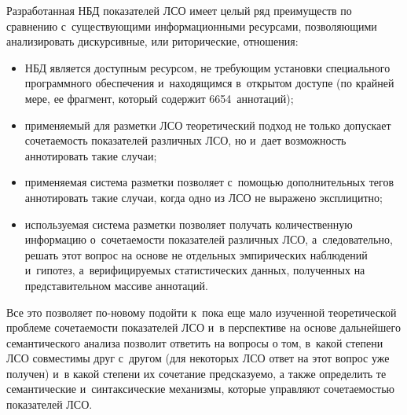 \begin{multicols}{2}
  Разработанная НБД показателей ЛСО имеет\linebreak
   целый ряд преимуществ по 
сравнению с~существующими информационными ресурсами, поз\-во\-ля\-ющи\-ми 
анализировать дискурсивные, или риторические, отношения:
  \begin{itemize}
\item НБД является доступным ресурсом, не требующим установки 
специального программного обеспечения и~находящимся в~открытом 
доступе (по крайней мере, ее фрагмент, который содержит 6654~аннотаций);\\[-14pt]
\item применяемый для разметки ЛСО теоретический подход не только 
допускает сочетаемость показателей различных ЛСО, но и~дает возможность 
аннотировать такие случаи;\\[-14pt]
\item применяемая система разметки позволяет с~помощью дополнительных 
тегов аннотировать такие случаи, когда одно из ЛСО не выражено 
эксплицитно;\\[-14pt]
\item используемая система разметки позволяет получать количественную 
информацию о~сочетаемости показателей различных ЛСО, а~следовательно, 
решать этот вопрос на основе не отдельных эмпирических наблюдений 
и~гипотез, а~верифицируемых статистических данных, полученных на 
представительном массиве аннотаций.
\end{itemize}
  
  Все это позволяет по-новому подойти к~пока еще мало изученной 
теоретической проблеме со\-че\-та\-емости показателей ЛСО и~в перспективе на 
основе дальнейшего семантического анализа позволит ответить на вопросы о 
том, в~какой степени ЛСО совместимы друг с~другом (для некоторых ЛСО 
ответ на этот вопрос уже получен) и~в какой степени их сочетание 
предсказуемо, а также определить те семантические и~синтаксические 
механизмы, которые управляют сочетаемостью показателей ЛСО.
  
  
 \vspace*{-6pt}
  
  
{\small\frenchspacing
 {%
 \begin{thebibliography}{99}
 
 \vspace*{-2pt}
 

\end{thebibliography}}}
\end{multicols}

